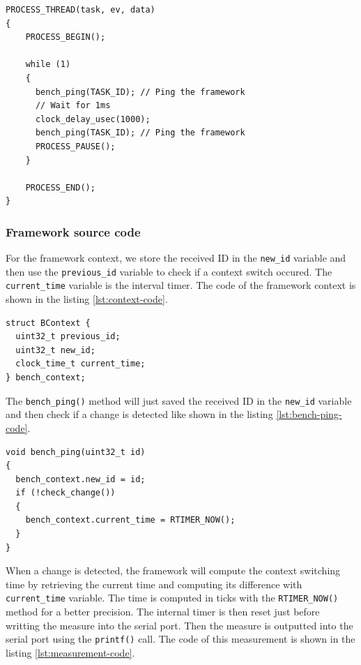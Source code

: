 \begin{lstlisting}[float, style=CStyle, label={lst:bench-task-code}, caption={Source code of the task with \texttt{bench\_ping()} calls}]
PROCESS_THREAD(task, ev, data)
{
    PROCESS_BEGIN();

    while (1)
    {
      bench_ping(TASK_ID); // Ping the framework
      // Wait for 1ms
      clock_delay_usec(1000);
      bench_ping(TASK_ID); // Ping the framework
      PROCESS_PAUSE();
    }

    PROCESS_END();
}
\end{lstlisting}

\subsubsection{Framework source code}

For the framework context, we store the received ID in the \texttt{new\_id} variable and then use the \texttt{previous\_id} variable to check if a context switch occured.
The \texttt{current\_time} variable is the interval timer.
The code of the framework context is shown in the listing \ref{lst:context-code}.

\begin{lstlisting}[style=CStyle, float, label={lst:context-code}, caption={Framework context implementation}]
struct BContext {
  uint32_t previous_id;
  uint32_t new_id;
  clock_time_t current_time;
} bench_context;
\end{lstlisting}

The \texttt{bench\_ping()} method will just saved the received ID in the \texttt{new\_id} variable and then check if a change is detected like shown in the listing \ref{lst:bench-ping-code}.

\begin{lstlisting}[style=CStyle, float, label={lst:bench-ping-code}, caption={\texttt{bench\_ping()} implementation}]
void bench_ping(uint32_t id)
{
  bench_context.new_id = id;
  if (!check_change())
  {
    bench_context.current_time = RTIMER_NOW();
  }
}
\end{lstlisting}

When a change is detected, the framework will compute the context switching time by retrieving the current time and computing its difference with \texttt{current\_time} variable.
The time is computed in ticks with the \texttt{RTIMER\_NOW()} method for a better precision.
The internal timer is then reset just before writting the measure into the serial port.
Then the measure is outputted into the serial port using the \texttt{printf()} call.
The code of this measurement is shown in the listing \ref{lst:measurement-code}.

